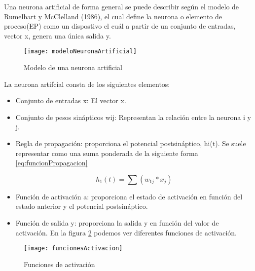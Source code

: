 Una neurona artificial de forma general se puede describir según el modelo de Rumelhart y McClelland (1986), el cual define la neurona o elemento de proceso(EP) como un dispostivo el cuál a partir de un conjunto de entradas, vector x, genera una única salida y. \cite{redesNeurnalesUno}

\begin{figure}[h]
    \begin{center}%
        \begin{center}%
          \texttt{[image: modeloNeuronaArtificial]}%
          \caption{Modelo de una neurona artificial}%
          \label{figmodeloNeuronaArtificial}%
        \end{center}%
  	\end{center}%
\end{figure}%

\newpage
La neurona artifcial consta de los siguientes elementos:

\begin{itemize}
	\item{Conjunto de entradas x}: El vector x.
	\item{Conjunto de pesos sinápticos wij}: Representan la relación entre la neurona i y j.
	\item{Regla de propagación}: proporciona el potencial postsináptico, hi(t). Se suele representar como una suma ponderada de la siguiente forma \ref{eq:funcionPropagacion}
	
\begin{equation} \label{eq:funcionPropagacion}
	h_{1}(t)=\sum (w_{1j}*x_{j})
\end{equation}

	\item{Función de activación a}: proporciona el estado de activación en función del estado anterior y el potencial postsináptico.
	\item{Función de salida y}: proporciona la salida y en función del valor de activación. En la figura \ref{figfuncionesActivacion} podemos ver diferentes funciones de activación.
\end{itemize}

\begin{figure}[h]
    \begin{center}%
        \begin{center}%
          \texttt{[image: funcionesActivacion]}%
          \caption{Funciones de activación}%
          \label{figfuncionesActivacion}%
        \end{center}%
  	\end{center}%
\end{figure}%
\newpage


